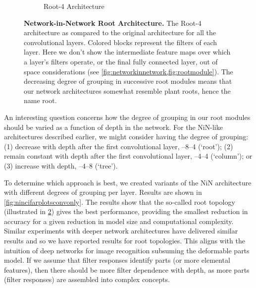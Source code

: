 \documentclass[thesis]{subfiles}
\begin{document}
{\begin{landscape}
\begin{figure}[p]
\begin{subfigure}[b]{0.98\linewidth}
			\caption{Root-4 Architecture}
			\label{fig:root4topology}
		\end{subfigure}
		\caption[Network in network standard \vs root architecture.]{\textbf{Network-in-Network Root Architecture.} The Root-4 architecture as compared to the original architecture for all the convolutional layers. Colored blocks represent the filters of each layer. Here we don't show the intermediate feature maps over which a layer's filters operate, or the final fully connected layer, out of space considerations (see \cref{fig:networkinnetwork,fig:rootmodule}). The decreasing degree of grouping in successive root modules means that our network architectures somewhat resemble plant roots, hence the name root.
		}\label{fig:networktopology}
	\end{figure}
	\end{landscape}
	}
	An interesting question concerns how the degree of grouping in our root modules should be varied as a function of depth in the network. For the NiN-like architectures described earlier, we might consider having the degree of grouping: (1) decrease with depth after the first convolutional layer, --8--4 (`root'); (2) remain constant with depth after the first convolutional layer, --4--4 (`column'); or (3) increase with depth, --4--8 (`tree').
	
	To determine which approach is best, we created variants of the NiN architecture with different degrees of grouping per layer. Results are shown in \cref{fig:nincifarplotsconvonly}. The results show that the so-called root topology (illustrated in \cref{fig:networktopology}) gives the best performance, providing the smallest reduction in accuracy for a given reduction in model size and computational complexity. Similar experiments with deeper network architectures have delivered similar results and so we have reported results for root topologies. This aligns with the intuition of deep networks for image recognition subsuming the deformable parts model. If we assume that filter responses identify parts (or more elemental features), then there should be more filter dependence with depth, as more parts (filter responses) are assembled into complex concepts.
	
\end{document}
